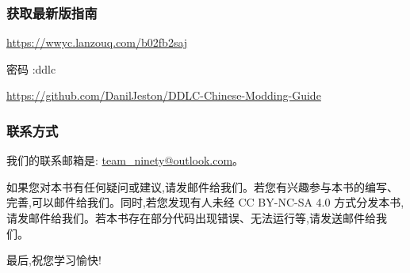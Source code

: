 \subsubsection*{获取最新版指南}
\url{https://wwyc.lanzouq.com/b02fb2saj}

密码 :ddlc

\url{https://github.com/DanilJeston/DDLC-Chinese-Modding-Guide}

\subsubsection*{联系方式}
我们的联系邮箱是: \url{team_ninety@outlook.com}。
\newline\newline\par
如果您对本书有任何疑问或建议,请发邮件给我们。若您有兴趣参与本书的编写、完善,可以邮件给我们。同时,若您发现有人未经 CC BY-NC-SA 4.0 方式分发本书,请发邮件给我们。若本书存在部分代码出现错误、无法运行等,请发送邮件给我们。

最后,祝您学习愉快!